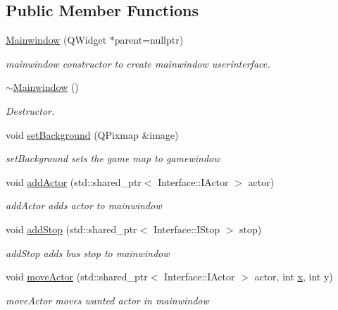 \subsection*{Public Member Functions}
\begin{DoxyCompactItemize}
\item 
\hyperlink{class_student_side_1_1_mainwindow_a3be9249fcf6ae0439eab93841d84a4bc}{Mainwindow} (Q\-Widget $\ast$parent=nullptr)
\begin{DoxyCompactList}\small\item\em mainwindow constructor to create mainwindow userinterface. \end{DoxyCompactList}\item 
\hyperlink{class_student_side_1_1_mainwindow_abe12f13a949502ef80a5a4d8a649e410}{$\sim$\-Mainwindow} ()
\begin{DoxyCompactList}\small\item\em Destructor. \end{DoxyCompactList}\item 
void \hyperlink{class_student_side_1_1_mainwindow_a7cc5ee10d853012e479510ee80443d13}{set\-Background} (Q\-Pixmap \&image)
\begin{DoxyCompactList}\small\item\em set\-Background sets the game map to gamewindow \end{DoxyCompactList}\item 
void \hyperlink{class_student_side_1_1_mainwindow_aa6c19fef8cc6731de13b45764277ec67}{add\-Actor} (std\-::shared\-\_\-ptr$<$ Interface\-::\-I\-Actor $>$ actor)
\begin{DoxyCompactList}\small\item\em add\-Actor adds actor to mainwindow \end{DoxyCompactList}\item 
void \hyperlink{class_student_side_1_1_mainwindow_a27478d3419382f2bb8381c7c5af5c8ee}{add\-Stop} (std\-::shared\-\_\-ptr$<$ Interface\-::\-I\-Stop $>$ stop)
\begin{DoxyCompactList}\small\item\em add\-Stop adds bus stop to mainwindow \end{DoxyCompactList}\item 
void \hyperlink{class_student_side_1_1_mainwindow_a7c75210e41e3f9f962b77ebeaaa60811}{move\-Actor} (std\-::shared\-\_\-ptr$<$ Interface\-::\-I\-Actor $>$ actor, int \hyperlink{jquery_8js_a4c3eadaa5164016d2c340d495fc6e55e}{x}, int y)
\begin{DoxyCompactList}\small\item\em move\-Actor moves wanted actor in mainwindow \end{DoxyCompactList}\item 

\end{DoxyCompactItemize}
